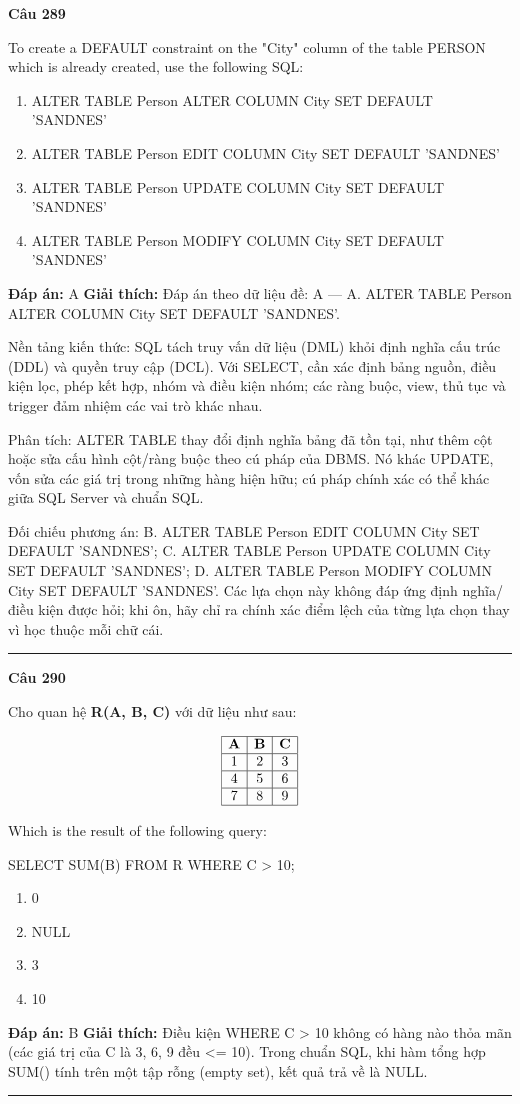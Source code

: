 \documentclass[11pt,a4paper]{article}
\newenvironment{question}[1]{%
  \par\vspace{1em}\noindent\textbf{\large Câu #1}\par\vspace{0.4em}
}{%
  \par\vspace{1em}\hrule\vspace{0.6em}
}
\newenvironment{choices}{%
  \begin{enumerate}[label=\textbf{\Alph*.},leftmargin=2.2em,itemsep=2pt,topsep=3pt]
}{%
  \end{enumerate}
}
\newcommand{\choice}{\item}
\newenvironment{codebox}{%
  \begin{tcolorbox}[colback=gray!8!white,colframe=gray!50!black,arc=1.5mm,boxrule=0.6pt,left=3mm,right=3mm,top=2.5mm,bottom=2.5mm]
  \ttfamily\small
}{%
  \end{tcolorbox}
}
\begin{document}
\begin{question}{289}
To create a DEFAULT constraint on the "City" column of the table PERSON which is already created, use the following SQL:
\begin{choices}
\choice ALTER TABLE Person
ALTER COLUMN City SET DEFAULT 'SANDNES'
\choice ALTER TABLE Person
EDIT COLUMN City SET DEFAULT 'SANDNES'
\choice ALTER TABLE Person
UPDATE COLUMN City SET DEFAULT 'SANDNES'
\choice ALTER TABLE Person
MODIFY COLUMN City SET DEFAULT 'SANDNES'
\end{choices}
\textbf{Đáp án:} A
\textbf{Giải thích:} Đáp án theo dữ liệu đề: A — A. ALTER TABLE Person ALTER COLUMN City SET DEFAULT 'SANDNES'.

Nền tảng kiến thức: SQL tách truy vấn dữ liệu (DML) khỏi định nghĩa cấu trúc (DDL) và quyền truy cập (DCL). Với SELECT, cần xác định bảng nguồn, điều kiện lọc, phép kết hợp, nhóm và điều kiện nhóm; các ràng buộc, view, thủ tục và trigger đảm nhiệm các vai trò khác nhau.

Phân tích: ALTER TABLE thay đổi định nghĩa bảng đã tồn tại, như thêm cột hoặc sửa cấu hình cột/ràng buộc theo cú pháp của DBMS. Nó khác UPDATE, vốn sửa các giá trị trong những hàng hiện hữu; cú pháp chính xác có thể khác giữa SQL Server và chuẩn SQL.

Đối chiếu phương án: B. ALTER TABLE Person EDIT COLUMN City SET DEFAULT 'SANDNES'; C. ALTER TABLE Person UPDATE COLUMN City SET DEFAULT 'SANDNES'; D. ALTER TABLE Person MODIFY COLUMN City SET DEFAULT 'SANDNES'. Các lựa chọn này không đáp ứng định nghĩa/điều kiện được hỏi; khi ôn, hãy chỉ ra chính xác điểm lệch của từng lựa chọn thay vì học thuộc mỗi chữ cái.
\end{question}

\begin{question}{290}
Cho quan hệ \textbf{R(A, B, C)} với dữ liệu như sau:

$$\begin{array}{|c|c|c|}
\hline
\textbf{A} & \textbf{B} & \textbf{C} \\
\hline
1 & 2 & 3 \\
\hline
4 & 5 & 6 \\
\hline
7 & 8 & 9 \\
\hline
\end{array}$$

Which is the result of the following query:
\begin{codebox}
SELECT SUM(B)
FROM R
WHERE C > 10;
\end{codebox}
\begin{choices}
\choice 0
\choice NULL
\choice 3
\choice 10
\end{choices}
\textbf{Đáp án:} B
\textbf{Giải thích:} Điều kiện WHERE C > 10 không có hàng nào thỏa mãn (các giá trị của C là 3, 6, 9 đều <= 10). Trong chuẩn SQL, khi hàm tổng hợp SUM() tính trên một tập rỗng (empty set), kết quả trả về là NULL.
\end{question}
\end{document}
